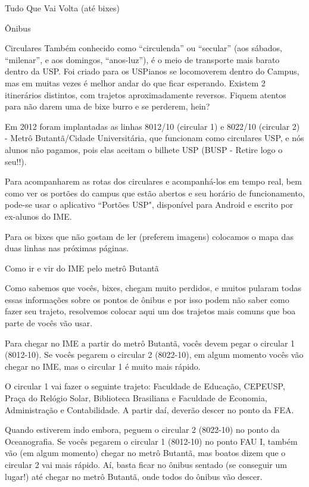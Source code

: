 \begin{secao}{Tudo Que Vai Volta (até bixes)}
\begin{subsecao}{Ônibus}
\begin{subsubsecao}{Circulares}
Também conhecido como ``circulenda'' ou ``secular'' (aos sábados, ``milenar'',
e aos domingos, ``anos-luz''), é o meio de transporte mais barato dentro da USP.
Foi criado para os USPianos se locomoverem dentro do Campus, mas em muitas vezes
é melhor andar do que ficar esperando. Existem 2 itinerários distintos, com
trajetos aproximadamente reversos. Fiquem atentos para não darem uma de bixe
burro e se perderem, hein?

Em 2012 foram implantadas as linhas 8012/10 (circular 1) e 8022/10 (circular 2)
- Metrô Butantã/Cidade Universitária,
que funcionam como circulares USP, e nós alunos não pagamos, pois elas aceitam
o bilhete USP (BUSP - Retire logo o seu!!).

Para acompanharem as rotas dos circulares e acompanhá-los em tempo real, bem como
ver os portões do campus que estão abertos e seu horário de funcionamento, pode-se
usar o aplicativo “Portões USP", disponível para Android e escrito por ex-alunos
do IME.

Para os bixes que não gostam de ler (preferem imagens) colocamos o
mapa das duas linhas nas próximas páginas.


\end{subsubsecao}

\begin{subsubsecao}{Como ir e vir do IME pelo metrô Butantã}

Como sabemos que vocês, bixes, chegam muito perdidos, e muitos pularam todas essas informações
sobre os pontos de ônibus e por isso podem não saber como fazer seu trajeto, resolvemos colocar
aqui um dos trajetos mais comuns que boa parte de vocês vão usar.

Para chegar no IME a partir do metrô Butantã, vocês devem pegar o circular 1 (8012-10).
Se vocês pegarem o circular 2 (8022-10), em algum momento vocês vão chegar no IME, mas
o circular 1 é muito mais rápido.

O circular 1 vai fazer o seguinte trajeto: Faculdade de Educação, CEPEUSP, Praça do Relógio
Solar, Biblioteca Brasiliana e Faculdade de Economia, Administração e Contabilidade. A partir
daí, deverão descer no ponto da FEA.

Quando estiverem indo embora, peguem o circular 2 (8022-10) no ponto da Oceanografia. Se vocês
pegarem o circular 1 (8012-10) no ponto FAU I, também vão (em algum momento) chegar no metrô
Butantã, mas boatos dizem que o circular 2 vai mais rápido. Aí, basta ficar no ônibus sentado
(se conseguir um lugar!) até chegar no metrô Butantã, onde todos do ônibus vão descer.


\end{subsubsecao}
\end{subsecao}
\end{secao}
